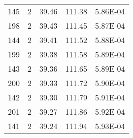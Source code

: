 \begin{longtable}{ccccc}
	145   & 2     & 39.46  & 111.38  & 5.86E-04 \\
	198   & 2     & 39.43  & 111.45  & 5.87E-04 \\
	144   & 2     & 39.41  & 111.52  & 5.88E-04 \\
	199   & 2     & 39.38  & 111.58  & 5.89E-04 \\
	143   & 2     & 39.36  & 111.65  & 5.89E-04 \\
	200   & 2     & 39.33  & 111.72  & 5.90E-04 \\
	142   & 2     & 39.30  & 111.79  & 5.91E-04 \\
	201   & 2     & 39.27  & 111.86  & 5.92E-04 \\
	141   & 2     & 39.24  & 111.94  & 5.93E-04 
	\label{tab:apptab1}%
	
\end{longtable}%